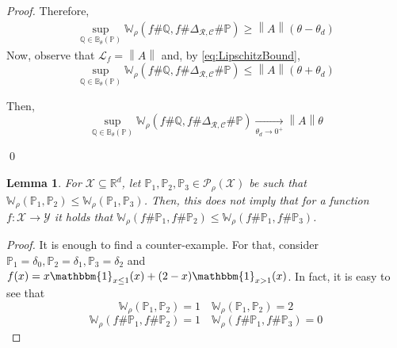 \documentclass[11pt, a4paper, oneside,reqno]{amsart}
\theoremstyle{plain}
\newtheorem{lemma}[theorem]{Lemma}
\def\prob{\mathbb{P}}
\def\probQ{\mathbb{Q}}
\def\wasserstein{{\mathbb{W}}}
\def\indicator{{\mathbbm{1}}}
\newcommand{\norm}[1]{\left\lVert#1\right\rVert}
\def\realNum{{\mathbb{R}}}
\def\sL{{\mathcal{L}}}
\def\sP{{\mathcal{P}}}
\def\sX{{\mathcal{X}}}
\def\sY{{\mathcal{Y}}}
\def\bsR{{\bm{\mathcal{R}}}}
\def\bsC{{\bm{\mathcal{C}}}}
\begin{document}
\begin{proof}
    Therefore,
    \begin{align*}
            \sup_{\probQ \in \mathbb{B}_{\theta}(\prob)} \wasserstein_\rho(f \# \probQ, f \# \Delta_{\bsR, \bsC}\#\prob) \geq \norm{A} (\theta-\theta_d)
        \end{align*}
    Now, observe that $\sL_f = \norm{A}$ and, by \eqref{eq:LipschitzBound}, 
    $$\sup_{\probQ \in \mathbb{B}_{\theta}(\prob)} \wasserstein_\rho(f \# \probQ, f \# \Delta_{\bsR, \bsC}\#\prob) \leq \norm{A} (\theta+\theta_d)$$
    
    Then,
    \begin{equation*}
        \sup_{\probQ \in \mathbb{B}_{\theta}(\prob)} \wasserstein_\rho(f \# \probQ, f \# \Delta_{\bsR, \bsC}\#\prob) \xrightarrow[\theta_d \to 0^+]{} \norm{A} \theta
    \end{equation*}
    
    \qed
    \end{proof}
    
    
    \begin{lemma}\label{lemma:pushforward-non-linear-effect}
        For $\sX \subseteq \realNum^d$, let $\prob_1,\prob_2,\prob_3 \in \sP_\rho(\sX)$ be such that $\wasserstein_{\rho}(\prob_1,\prob_2) \leq \wasserstein_{\rho}(\prob_1,\prob_3)$. Then, this does not imply that for a function $f:\sX \to \sY$ it holds that $\wasserstein_{\rho}(f\#\prob_1,f\#\prob_2) \leq \wasserstein_{\rho}(f\#\prob_1,f\#\prob_3)$.
    \end{lemma}
    \begin{proof}
    It is enough to find a counter-example. For that, consider $\prob_1=\delta_0,\prob_2=\delta_1,\prob_3=\delta_2$ and $f(x) =x \indicator_{x\leq 1}(x) + (2-x)\indicator_{x>1}(x)$. In fact, it is easy to see that 
    $$ \wasserstein_{\rho}(\prob_1,\prob_2)=1 \quad  \wasserstein_{\rho}(\prob_1,\prob_2)=2$$
    $$ \wasserstein_{\rho}(f\#\prob_1,f\#\prob_2)=1 \quad  \wasserstein_{\rho}(f\#\prob_1,f\#\prob_3)=0$$
    \end{proof}
\fi
\end{document}
